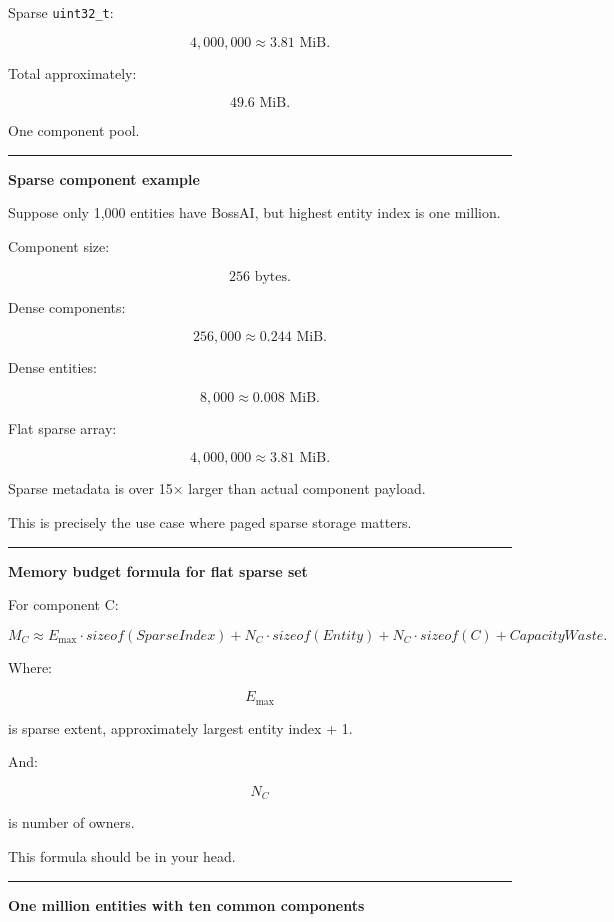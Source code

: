 Sparse \texttt{uint32\_t}:

\[
4,000,000
\approx3.81\text{ MiB}.
\]

Total approximately:

\[
49.6\text{ MiB}.
\]

One component pool.

\begin{center}\rule{0.5\linewidth}{0.5pt}\end{center}

\textbf{Sparse component example}

Suppose only 1,000 entities have BossAI, but highest entity index is one million.

Component size:

\[
256\text{ bytes}.
\]

Dense components:

\[
256,000
\approx0.244\text{ MiB}.
\]

Dense entities:

\[
8,000
\approx0.008\text{ MiB}.
\]

Flat sparse array:

\[
4,000,000
\approx3.81\text{ MiB}.
\]

Sparse metadata is over 15× larger than actual component payload.

This is precisely the use case where paged sparse storage matters.

\begin{center}\rule{0.5\linewidth}{0.5pt}\end{center}

\textbf{Memory budget formula for flat sparse set}

For component C:

\[
\boxed{
M_C
\approx
E_{\max}\cdot sizeof(SparseIndex)
+
N_C\cdot sizeof(Entity)
+
N_C\cdot sizeof(C)
+
CapacityWaste.
}
\]

Where:

\[
E_{\max}
\]

is sparse extent, approximately largest entity index + 1.

And:

\[
N_C
\]

is number of owners.

This formula should be in your head.

\begin{center}\rule{0.5\linewidth}{0.5pt}\end{center}

\textbf{One million entities with ten common components}


